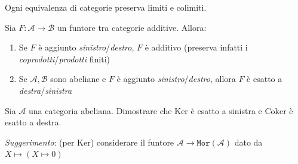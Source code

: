 \begin{corollary}{}
    Ogni equivalenza di categorie preserva limiti e colimiti.
\end{corollary}

\begin{corollary}{}
    Sia \(F : \mathcal{A} \to \mathcal{B}\) un funtore tra categorie additive.
    Allora:
\begin{enumerate}[label = \arabic*.]
    \item Se \(F\) è aggiunto \emph{sinistro}/\emph{destro}, \(F\) è additivo
        (preserva infatti i \emph{coprodotti}/\emph{prodotti} finiti)
    \item Se \(\mathcal{A}, \mathcal{B}\) sono abeliane e \(F\) è aggiunto
        \emph{sinistro}/\emph{destro}, allora \(F\) è esatto a
        \emph{destra}/\emph{sinistra}
\end{enumerate}
\end{corollary}

\begin{eser}{}
    Sia \(\mathcal{A}\) una categoria abeliana. Dimostrare che \(\mathrm{Ker}\)
    è esatto a sinistra e \(\mathrm{Coker}\) è esatto a destra.

    \emph{Suggerimento}: (per \(\mathrm{Ker}\)) considerare il funtore \(\mathcal{A} \to
    \mathtt{Mor}{(\mathcal{A})}\) dato da \(X \mapsto {(X \mapsto 0)}\) 
\end{eser}

